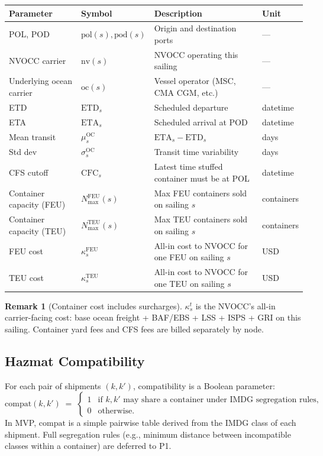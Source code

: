 \documentclass[11pt,a4paper]{article}
\theoremstyle{definition}
\newtheorem{remark}{Remark}
\begin{document}
\begin{center}
\begin{tabular}{llp{6.5cm}l}
\toprule
Parameter & Symbol & Description & Unit \\
\midrule
POL, POD & $\text{pol}(s), \text{pod}(s)$ & Origin and destination ports & — \\
NVOCC carrier & $\text{nv}(s)$ & NVOCC operating this sailing & — \\
Underlying ocean carrier & $\text{oc}(s)$ & Vessel operator (MSC, CMA CGM, etc.) & — \\
ETD & $\text{ETD}_s$ & Scheduled departure & datetime \\
ETA & $\text{ETA}_s$ & Scheduled arrival at POD & datetime \\
Mean transit & $\mu_s^{\text{OC}}$ & $\text{ETA}_s - \text{ETD}_s$ & days \\
Std dev & $\sigma_s^{\text{OC}}$ & Transit time variability & days \\
CFS cutoff & $\text{CFC}_s$ & Latest time stuffed container must be at POL & datetime \\
Container capacity (FEU) & $N_{\max}^{\text{FEU}}(s)$ & Max FEU containers sold on sailing $s$ & containers \\
Container capacity (TEU) & $N_{\max}^{\text{TEU}}(s)$ & Max TEU containers sold on sailing $s$ & containers \\
FEU cost & $\kappa_s^{\text{FEU}}$ & All-in cost to NVOCC for one FEU on sailing $s$ & USD \\
TEU cost & $\kappa_s^{\text{TEU}}$ & All-in cost to NVOCC for one TEU on sailing $s$ & USD \\
\bottomrule
\end{tabular}
\end{center}

\begin{remark}[Container cost includes surcharges]
$\kappa_s^t$ is the NVOCC's all-in carrier-facing cost: base ocean freight + BAF/EBS + LSS +
ISPS + GRI on this sailing. Container yard fees and CFS fees are billed separately by node.
\end{remark}

\subsection{Hazmat Compatibility}

For each pair of shipments $(k, k')$, compatibility is a Boolean parameter:
\begin{equation}
  \text{compat}(k, k') \;=\;
  \begin{cases}
    1 & \text{if } k, k' \text{ may share a container under IMDG segregation rules,} \\
    0 & \text{otherwise.}
  \end{cases}
\end{equation}
In MVP, $\text{compat}$ is a simple pairwise table derived from the IMDG class of each
shipment. Full segregation rules (e.g., minimum distance between incompatible classes within
a container) are deferred to P1.
\end{document}
